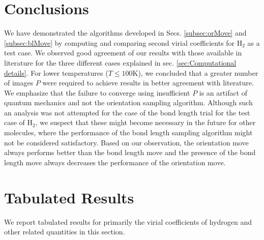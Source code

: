     \section{Conclusions}
        \label{sec:Conclusions and future work}
        We have demonstrated the algorithms developed in Secs. \ref{subsec:orMove} and \ref{subsec:blMove} by computing and comparing second virial coefficients for H$_2$ as a test case. We observed good agreement of our results with those available in literature for the three different cases explained in sec. \ref{sec:Computational details}. For lower temperatures ($T \le 100 $K), we concluded that a greater number of images $P$ were required to achieve results in better agreement with literature. We emphasize that the failure to converge using insufficient $P$ is an artifact of quantum mechanics and not the orientation sampling algorithm. Although such an analysis was not attempted for the case of the bond length trial for the test case of H$_2$, we suspect that these might become necessary in the future for other molecules, where the performance of the bond length sampling algorithm might not be considered satisfactory. Based on our observation, the orientation move always performs better than the bond length move and the presence of the bond length move always decreases the performance of the orientation move.

    \section{Tabulated Results}
    \label{sec:chap4-tables}
        We report tabulated results for primarily the virial coefficients of hydrogen and other related quantities in this section.


